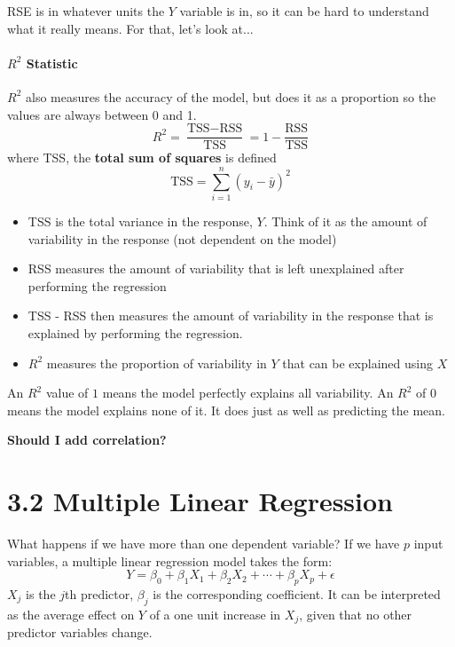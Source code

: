         RSE is in whatever units the $Y$ variable is in, so it can be hard to understand what it really means.   For that, let's look at...
        \paragraph{$R^2$ Statistic\\}
        $R^2$ also measures the accuracy of the model, but does it as a proportion so the values are always between 0 and 1.
        \begin{equation*}\tag{3.17}
            R^2 = \frac{\text{TSS}-\text{RSS}}{\text{TSS}} = 1 - \frac{\text{RSS}}{\text{TSS}}
        \end{equation*}
        where TSS, the \textbf{total sum of squares} is defined
        \begin{equation*}
            \text{TSS} = \sum_{i=1}^n(y_i - \bar y)^2
        \end{equation*}
        \begin{itemize}
            \tightlist
            \item TSS is the total variance in the response, $Y$.  Think of it as the amount of variability in the response (not dependent on the model)
            \item RSS measures the amount of variability that is left unexplained after performing the regression
            \item TSS - RSS then measures the amount of variability in the response that is explained by performing the regression.
            \item $R^2$ measures the proportion of variability in $Y$ that can be explained using $X$
        \end{itemize}
        An $R^2$ value of $1$ means the model perfectly explains all variability.  An $R^2$ of $0$ means the model explains none of it.  It does just as well as predicting the mean.
        
        \textbf{Should I add correlation?}
        
        \section*{3.2 Multiple Linear  Regression}\label{multiple-linear-regression}
        What happens if we have more than one dependent variable?  If we have $p$ input variables, a multiple linear regression model takes the form:
        \begin{equation*}\tag{3.19}
            Y = \beta_0 + \beta_1 X_1 + \beta_2 X_2 + \cdots + \beta_p X_p + \epsilon
         \end{equation*}
         $X_j$ is the $j$th predictor, $\beta_j$ is the corresponding coefficient.  It can be interpreted as the average effect on $Y$ of a one unit increase in $X_j$, given that no other predictor variables change.
        

